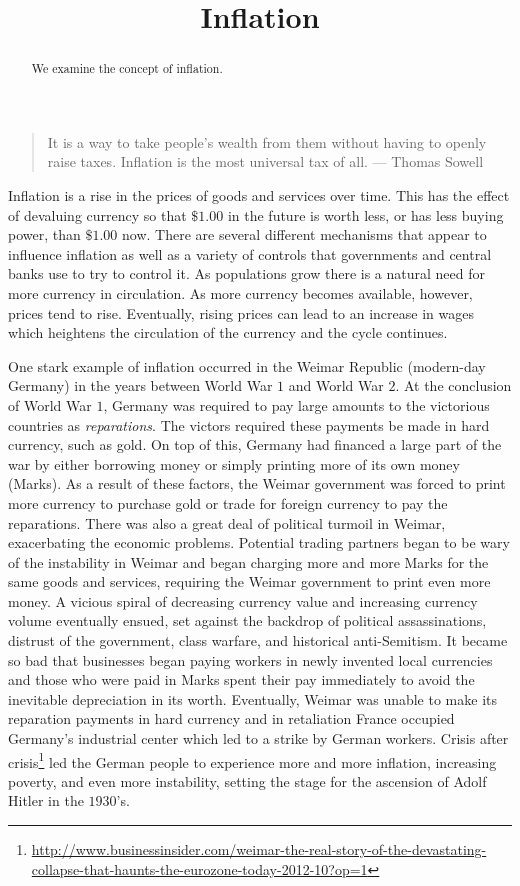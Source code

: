 \documentclass{ximera}
\title{Inflation}
\begin{document}
\begin{abstract}
We examine the concept of inflation.
\end{abstract}
\maketitle

\begin{quote}
It is a way to take people's wealth from them without having to openly raise taxes. Inflation is the most universal tax of all. --- Thomas Sowell
\end{quote}

Inflation is a rise in the prices of goods and services over time. This has the effect of devaluing currency so that $\$1.00$ in the future is worth less, or has less buying power, than $\$1.00$ now. There are several different mechanisms that appear to influence inflation as well as a variety of controls that governments and central banks use to try to control it. As populations grow there is a natural need for more currency in circulation. As more currency becomes available, however, prices tend to rise. Eventually, rising prices can lead to an increase in wages which heightens the circulation of the currency and the cycle continues.

One stark example of inflation occurred in the Weimar Republic (modern-day Germany) in the years between World War $1$ and World War $2$. At the conclusion of World War $1$, Germany was required to pay large amounts to the victorious countries as \emph{reparations}. The victors required these payments be made in hard currency, such as gold. On top of this, Germany had financed a large part of the war by either borrowing money or simply printing more of its own money (Marks). As a result of these factors, the Weimar government was forced to print more currency to purchase gold or trade for foreign currency to pay the reparations. There was also a great deal of political turmoil in Weimar, exacerbating the economic problems. Potential trading partners began to be wary of the instability in Weimar and began charging more and more Marks for the same goods and services, requiring the Weimar government to print even more money. A vicious spiral of decreasing currency value and increasing currency volume eventually ensued, set against the backdrop of political assassinations, distrust of the government, class warfare, and historical anti-Semitism. It became so bad that businesses began paying workers in newly invented local currencies and those who were paid in Marks spent their pay immediately to avoid the inevitable depreciation in its worth. Eventually, Weimar was unable to make its reparation payments in hard currency and in retaliation France occupied Germany's industrial center which led to a strike by German workers. Crisis after crisis\footnote{\href{http://www.businessinsider.com/weimar-the-real-story-of-the-devastating-collapse-that-haunts-the-eurozone-today-2012-10?op=1}{http://www.businessinsider.com/weimar-the-real-story-of-the-devastating-collapse-that-haunts-the-eurozone-today-2012-10?op=1}} led the German people to experience more and more inflation, increasing poverty, and even more instability, setting the stage for the ascension of Adolf Hitler in the $1930$'s.
\end{document}
